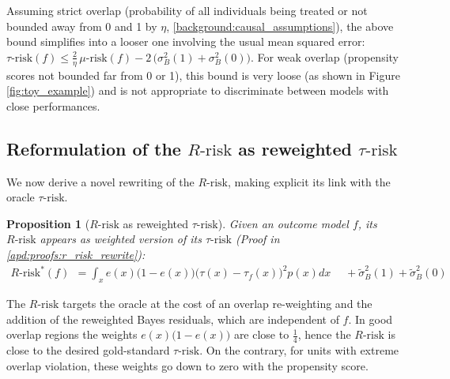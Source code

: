 \documentclass[french,12pt,twoside,a4paper]{book}
\newtheorem{proposition}{Proposition}
\begin{document}
Assuming strict overlap (probability of all individuals being treated or not
bounded away from 0 and 1 by $\eta$, \ref{background:causal_assumptions}), the
above bound simplifies into a looser one involving the usual mean squared error:
$\tau\text{-risk}(f)\leq \frac{2}{\eta}\, \mu\text{-risk}(f) -  2 \, \big(\sigma^2_{B}(1) +  \sigma^2_{B}(0)\big)$. For weak overlap (propensity scores not bounded far from 0
or 1), this bound is very loose (as shown in Figure \ref{fig:toy_example})
and is not appropriate to discriminate between models with close performances.


\subsection{Reformulation of the $R\text{-risk}$ as reweighted $\tau\text{-risk}$}%
\label{theory:r_risk_rewrite}%

We now derive a novel rewriting of the $R\text{-risk}$, making explicit its link
with the oracle $\tau \text{-risk}$.

\begin{proposition}[$R \text{-risk}$ as reweighted
    $\tau\text{-risk}$]\label{theory:prop:r_risk_rewrite} Given an outcome model
  $f$, its $R\text{-risk}$ appears as weighted version of its $\tau\text{-risk}$
  (Proof in \ref{apd:proofs:r_risk_rewrite}):
  \begin{align}
    R\text{-risk}^*(f) & = \int_{x} e(x)\big(1-e(x)\big)\big(\tau(x)-\tau_ {f}(x)\big)^{2} p(x) d x  \quad\; + \tilde{\sigma}_B^2(1) + \tilde{\sigma}_B^{2}(0)
  \end{align}
\end{proposition}

The $R \text{-risk}$ targets the oracle at the cost of an overlap re-weighting
and the addition of the reweighted Bayes residuals, which are independent of
$f$. In good overlap regions the weights $e(x) \big(1-e(x) \big)$ are close to
$\frac{1}{4}$, hence the $R \text{-risk}$ is close to the desired gold-standard
$\tau \text{-risk}$. On the contrary, for units with extreme overlap violation,
these weights go down to zero with the propensity score.

\end{document}
